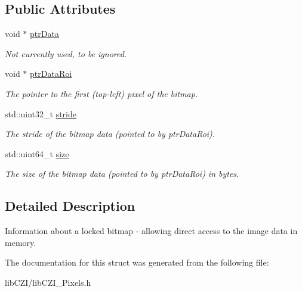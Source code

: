 \subsection*{Public Attributes}
\begin{DoxyCompactItemize}
\item 
\mbox{\label{structlib_c_z_i_1_1_bitmap_lock_info_a1113106a82231213cd4e8980d3106ebd}} 
void $\ast$ \hyperlink{structlib_c_z_i_1_1_bitmap_lock_info_a1113106a82231213cd4e8980d3106ebd}{ptr\+Data}
\begin{DoxyCompactList}\small\item\em Not currently used, to be ignored. \end{DoxyCompactList}\item 
\mbox{\label{structlib_c_z_i_1_1_bitmap_lock_info_ab54e2118992996eacc9ccd8e49397f09}} 
void $\ast$ \hyperlink{structlib_c_z_i_1_1_bitmap_lock_info_ab54e2118992996eacc9ccd8e49397f09}{ptr\+Data\+Roi}
\begin{DoxyCompactList}\small\item\em The pointer to the first (top-\/left) pixel of the bitmap. \end{DoxyCompactList}\item 
\mbox{\label{structlib_c_z_i_1_1_bitmap_lock_info_a8e7259142382ec0ad887c974d27775b6}} 
std\+::uint32\+\_\+t \hyperlink{structlib_c_z_i_1_1_bitmap_lock_info_a8e7259142382ec0ad887c974d27775b6}{stride}
\begin{DoxyCompactList}\small\item\em The stride of the bitmap data (pointed to by {\ttfamily ptr\+Data\+Roi}). \end{DoxyCompactList}\item 
\mbox{\label{structlib_c_z_i_1_1_bitmap_lock_info_a109f8d69b48bc4398861217c375dee1b}} 
std\+::uint64\+\_\+t \hyperlink{structlib_c_z_i_1_1_bitmap_lock_info_a109f8d69b48bc4398861217c375dee1b}{size}
\begin{DoxyCompactList}\small\item\em The size of the bitmap data (pointed to by {\ttfamily ptr\+Data\+Roi}) in bytes. \end{DoxyCompactList}\end{DoxyCompactItemize}


\subsection{Detailed Description}
Information about a locked bitmap -\/ allowing direct access to the image data in memory. 

The documentation for this struct was generated from the following file\+:\begin{DoxyCompactItemize}
\item 
lib\+C\+Z\+I/lib\+C\+Z\+I\+\_\+\+Pixels.\+h\end{DoxyCompactItemize}
